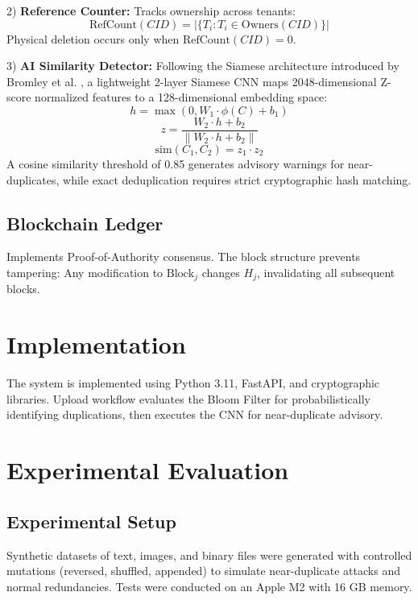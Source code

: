 \documentclass[conference]{IEEEtran}
\begin{document}
2) \textbf{Reference Counter:} Tracks ownership across tenants:
\begin{equation}
\text{RefCount}(CID) = |\{T_i : T_i \in \text{Owners}(CID)\}|
\end{equation}
Physical deletion occurs only when $\text{RefCount}(CID) = 0$.

3) \textbf{AI Similarity Detector:} Following the Siamese architecture introduced by Bromley et al. \cite{r16}, a lightweight 2-layer Siamese CNN maps 2048-dimensional Z-score normalized features to a 128-dimensional embedding space:
\begin{equation}
h = \max(0, W_{1} \cdot \phi(C) + b_{1})
\end{equation}
\begin{equation}
z = \frac{W_{2} \cdot h + b_{2}}{\|W_{2} \cdot h + b_{2}\|}
\end{equation}
\begin{equation}
\text{sim}(C_1, C_2) = z_1 \cdot z_2
\end{equation}
A cosine similarity threshold of 0.85 generates advisory warnings for near-duplicates, while exact deduplication requires strict cryptographic hash matching.

\subsection{Blockchain Ledger}
Implements Proof-of-Authority consensus. The block structure prevents tampering: Any modification to $\text{Block}_j$ changes $H_j$, invalidating all subsequent blocks.

\section{Implementation}
The system is implemented using Python 3.11, FastAPI, and cryptographic libraries. Upload workflow evaluates the Bloom Filter for probabilistically identifying duplications, then executes the CNN for near-duplicate advisory. 

\section{Experimental Evaluation}
\subsection{Experimental Setup}
Synthetic datasets of text, images, and binary files were generated with controlled mutations (reversed, shuffled, appended) to simulate near-duplicate attacks and normal redundancies. Tests were conducted on an Apple M2 with 16 GB memory.
\end{document}
